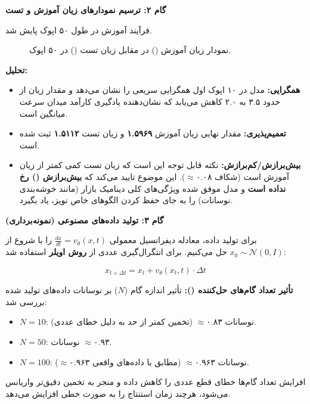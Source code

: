 \textbf{گام ۲: ترسیم نمودارهای زیان آموزش و تست}
\begin{solutionbox}
    فرآیند آموزش در طول ۵۰ اپوک پایش شد.

    \begin{figure}[H]
        \centering
        \caption{نمودار زیان آموزش () در مقابل زیان تست () در ۵۰ اپوک.}
        \label{fig:fm_loss}
    \end{figure}
    
    

    \textbf{تحلیل:}
    \begin{itemize}
        \item \textbf{همگرایی:} مدل در ۱۰ اپوک اول همگرایی سریعی را نشان می‌دهد و مقدار زیان از حدود ۳.۵ به ۲.۰ کاهش می‌یابد که نشان‌دهنده یادگیری کارآمد میدان سرعت میانگین است.
        \item \textbf{تعمیم‌پذیری:} مقدار نهایی زیان آموزش \textbf{۱.۵۹۶۹} و زیان تست \textbf{۱.۵۱۱۲} ثبت شده است.
        \item \textbf{بیش‌برازش/کم‌برازش:} نکته قابل توجه این است که زیان تست کمی کمتر از زیان آموزش است (شکاف $\approx ۰.۰۸$). این موضوع تایید می‌کند که \textbf{بیش‌برازش () رخ نداده است} و مدل موفق شده ویژگی‌های کلی دینامیک بازار (مانند خوشه‌بندی نوسانات) را به جای حفظ کردن الگوهای خاص نویز، یاد بگیرد.
    \end{itemize}
\end{solutionbox}

\textbf{گام ۳: تولید داده‌های مصنوعی (نمونه‌برداری)}
\begin{solutionbox}
    برای تولید داده، معادله دیفرانسیل معمولی $\frac{dx}{dt} = v_\theta(x, t)$ را با شروع از $x_0 \sim \mathcal{N}(0, I)$ حل می‌کنیم. برای انتگرال‌گیری عددی از \textbf{روش اویلر} استفاده شد:
    
    \[ x_{t+\Delta t} = x_t + v_\theta(x_t, t) \cdot \Delta t \]

    \textbf{تأثیر تعداد گام‌های حل‌کننده ():}
    تأثیر اندازه گام ($N$) بر نوسانات داده‌های تولید شده بررسی شد:
    \begin{itemize}
        \item $N=10$: نوسانات $\approx ۰.۸۳$ (تخمین کمتر از حد به دلیل خطای عددی).
        \item $N=50$: نوسانات $\approx ۰.۹۳$.
        \item \textbf{$N=100$}: نوسانات $\approx ۰.۹۶۳$ (مطابق با داده‌های واقعی $\approx ۰.۹۶۳$).
    \end{itemize}
    افزایش تعداد گام‌ها خطای قطع عددی را کاهش داده و منجر به تخمین دقیق‌تر واریانس می‌شود، هرچند زمان استنتاج را به صورت خطی افزایش می‌دهد.
\end{solutionbox}

